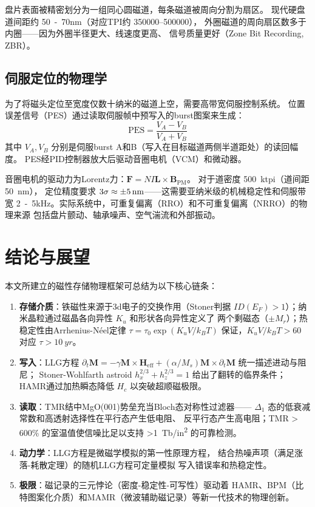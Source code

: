 \documentclass[11pt,a4paper,twoside]{article}
\theoremstyle{definition}
\theoremstyle{plain}
\theoremstyle{remark}
\begin{document}
盘片表面被精密划分为一组同心圆磁道，每条磁道被周向分割为扇区。
现代硬盘道间距约 \SI{50}{-70}{nm}（对应TPI约 \num{350000}--\num{500000}），
外圈磁道的周向扇区数多于内圈——因为外圈半径更大、线速度更高、
信号质量更好（Zone Bit Recording, ZBR）。

\subsection{伺服定位的物理学}

为了将磁头定位至宽度仅数十纳米的磁道上空，需要高带宽伺服控制系统。
位置误差信号（PES）通过读取伺服帧中预写入的burst图案来生成：
\begin{equation}
  \text{PES} = \frac{V_A - V_B}{V_A + V_B}
\end{equation}
其中 $V_A, V_B$ 分别是伺服burst A和B（写入在目标磁道两侧半道距处）的读回幅度。
PES经PID控制器放大后驱动音圈电机（VCM）和微动器。

音圈电机的驱动力为Lorentz力：$\mathbf{F} = N I \mathbf{L} \times \mathbf{B}_{\text{PM}}$。
对于道密度 \SI{500}{ktpi}（道间距 \SI{50}{nm}），
定位精度要求 $3\sigma \approx \SI{\pm5}{nm}$——这需要亚纳米级的机械稳定性和伺服带宽
\SI{2}{-5}{kHz}。实际系统中，可重复偏离（RRO）和不可重复偏离（NRRO）的物理来源
包括盘片颤动、轴承噪声、空气湍流和外部振动。

\section{结论与展望}
\label{sec:conclusion}

本文所建立的磁性存储物理框架可总结为以下核心链条：

\begin{enumerate}
  \item \textbf{存储介质}：铁磁性来源于3d电子的交换作用（Stoner判据
  $I D(E_F) > 1$）；纳米晶粒通过磁晶各向异性 $K_u$ 和形状各向异性定义了
  两个剩磁态（$\pm M_r$）；热稳定性由Arrhenius-N\'{e}el定律
  $\tau = \tau_0 \exp(K_u V / k_B T)$ 保证，$K_u V/k_B T > 60$ 对应
  $\tau > \SI{10}{yr}$。

  \item \textbf{写入}：LLG方程 $\partial_t \mathbf{M} = -\gamma \mathbf{M}\times\mathbf{H}_{\text{eff}}
  + (\alpha/M_s)\mathbf{M}\times\partial_t \mathbf{M}$ 统一描述进动与阻尼；
  Stoner-Wohlfarth astroid $h_x^{2/3} + h_z^{2/3} = 1$ 给出了翻转的临界条件；
  HAMR通过加热瞬态降低 $H_c$ 以突破超顺磁极限。

  \item \textbf{读取}：TMR结中MgO(001)势垒充当Bloch态对称性过滤器——
  $\Delta_1$ 态的低衰减常数和高透射选择性在平行态产生低电阻、
  反平行态产生高电阻；TMR > 600\% 的室温值使信噪比足以支持
  \SI{>1}{Tb/in^2} 的可靠检测。

  \item \textbf{动力学}：LLG方程是微磁学模拟的第一性原理方程，
  结合热噪声项（满足涨落-耗散定理）的随机LLG方程可定量模拟
  写入错误率和热稳定性。

  \item \textbf{极限}：磁记录的三元悖论（密度-稳定性-可写性）驱动着
  HAMR、BPM（比特图案化介质）和MAMR（微波辅助磁记录）等新一代技术的物理创新。
\end{enumerate}
\end{document}
